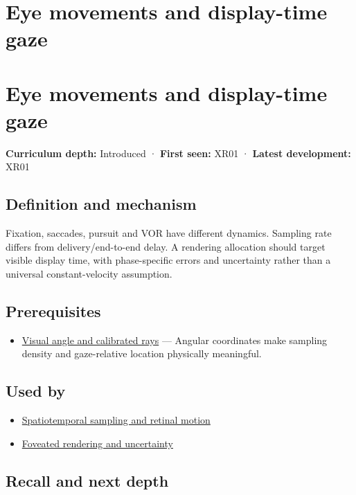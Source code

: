 \hypertarget{appendix-a6f2c4fe1996}{}
\section*{Eye movements and display-time gaze}
\section{Eye movements and display-time gaze}\label{eye-movements-and-display-time-gaze}

\textbf{Curriculum depth:} Introduced · \textbf{First seen:} XR01 · \textbf{Latest development:} XR01

\subsection{Definition and mechanism}\label{definition-and-mechanism}

Fixation, saccades, pursuit and VOR have different dynamics. Sampling rate differs from delivery/end-to-end delay. A rendering allocation should target visible display time, with phase-specific errors and uncertainty rather than a universal constant-velocity assumption.

\subsection{Prerequisites}\label{prerequisites}

\begin{itemize}
\tightlist
\item
  \hyperref[appendix-7d356c396d1a]{Visual angle and calibrated rays} --- Angular coordinates make sampling density and gaze-relative location physically meaningful.
\end{itemize}

\subsection{Used by}\label{used-by}

\begin{itemize}
\tightlist
\item
  \hyperref[appendix-70895739febb]{Spatiotemporal sampling and retinal motion}
\item
  \hyperref[appendix-5878b813b732]{Foveated rendering and uncertainty}
\end{itemize}

\subsection{Recall and next depth}\label{recall-and-next-depth}

